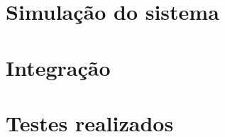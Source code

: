 \section{Simulação do sistema}
\label{sec:simul}


\section{Integração}
\label{sec:integra}



\section{Testes realizados}
\label{sec:testes}








